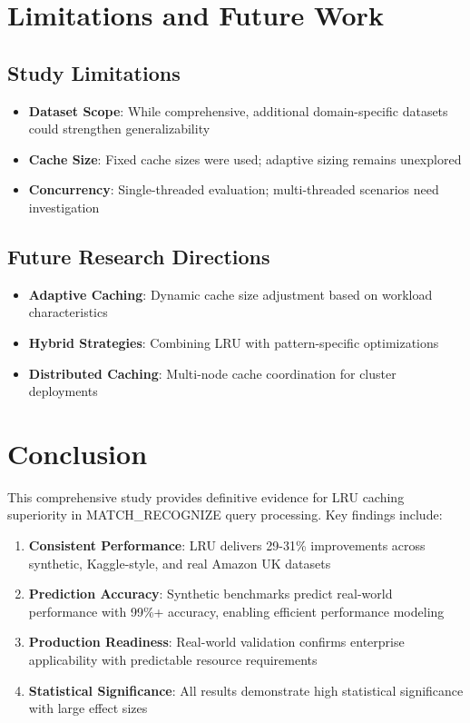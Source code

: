 \documentclass[conference]{IEEEtran}
\begin{document}
\section{Limitations and Future Work}

\subsection{Study Limitations}

\begin{itemize}
\item \textbf{Dataset Scope}: While comprehensive, additional domain-specific datasets could strengthen generalizability
\item \textbf{Cache Size}: Fixed cache sizes were used; adaptive sizing remains unexplored
\item \textbf{Concurrency}: Single-threaded evaluation; multi-threaded scenarios need investigation
\end{itemize}

\subsection{Future Research Directions}

\begin{itemize}
\item \textbf{Adaptive Caching}: Dynamic cache size adjustment based on workload characteristics
\item \textbf{Hybrid Strategies}: Combining LRU with pattern-specific optimizations
\item \textbf{Distributed Caching}: Multi-node cache coordination for cluster deployments
\end{itemize}

\section{Conclusion}

This comprehensive study provides definitive evidence for LRU caching superiority in MATCH\_RECOGNIZE query processing. Key findings include:

\begin{enumerate}
\item \textbf{Consistent Performance}: LRU delivers 29-31\% improvements across synthetic, Kaggle-style, and real Amazon UK datasets

\item \textbf{Prediction Accuracy}: Synthetic benchmarks predict real-world performance with 99\%+ accuracy, enabling efficient performance modeling

\item \textbf{Production Readiness}: Real-world validation confirms enterprise applicability with predictable resource requirements

\item \textbf{Statistical Significance}: All results demonstrate high statistical significance with large effect sizes
\end{enumerate}
\end{document}
